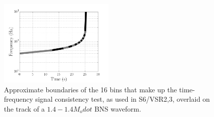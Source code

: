 




\begin{figure}
\includegraphics[width=0.5\textwidth]{papers/bns_o1_dev/figures/bin.png}
\caption{\label{fig:chisqbins} 
Approximate boundaries of the 16 bins that make up the time-frequency signal consistency test, as used in S6/VSR2,3, overlaid on the track of a $1.4-1.4M_odot$ BNS waveform. 
}
\end{figure}


